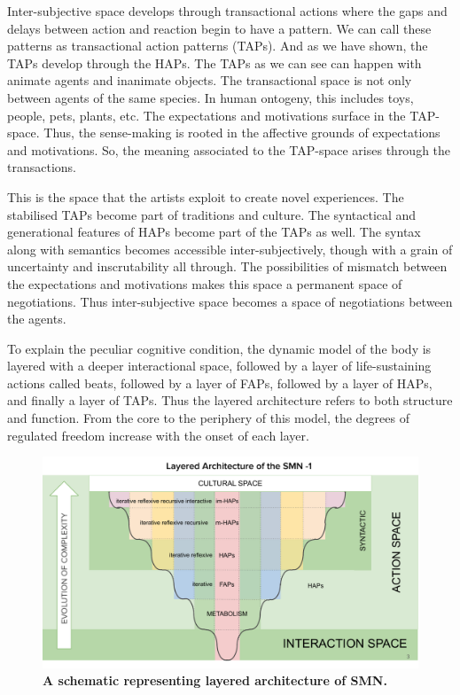 Inter-subjective space develops through transactional actions where the gaps and delays between action and reaction begin to have a pattern. We can call these patterns as transactional action patterns (TAPs). And as we have shown, the TAPs develop through the HAPs. The TAPs as we can see can happen with animate agents and inanimate objects. The transactional space is not only between agents of the same species. In human ontogeny, this includes toys, people, pets, plants, etc. The expectations and motivations surface in the TAP-space. Thus, the sense-making is rooted in the affective grounds of expectations and motivations. So, the meaning associated to the TAP-space arises through the transactions. 

This is the space that the artists exploit to create novel experiences. The stabilised TAPs become part of traditions and culture. The syntactical and generational features of HAPs become part of the TAPs as well. The syntax along with semantics becomes accessible inter-subjectively, though with a grain of uncertainty and inscrutability all through. The possibilities of mismatch between the expectations and motivations makes this space a permanent space of negotiations. Thus inter-subjective space becomes a space of negotiations between the agents. 

To explain the peculiar cognitive condition, the dynamic model of the body is layered with a deeper interactional space, followed by a layer of life-sustaining actions called beats, followed by a layer of FAPs, followed by a layer of HAPs, and finally a layer of TAPs. Thus the layered architecture refers to both structure and function. From the core to the periphery of this model, the degrees of regulated freedom increase with the onset of each layer. 

\begin{figure}[ht] 
\includegraphics[width=\textwidth]{graphics/SideViewLayers.pdf}
\caption{\textbf{A schematic representing layered architecture of SMN.}}
\label{side_view_lSMN}
\end{figure}

